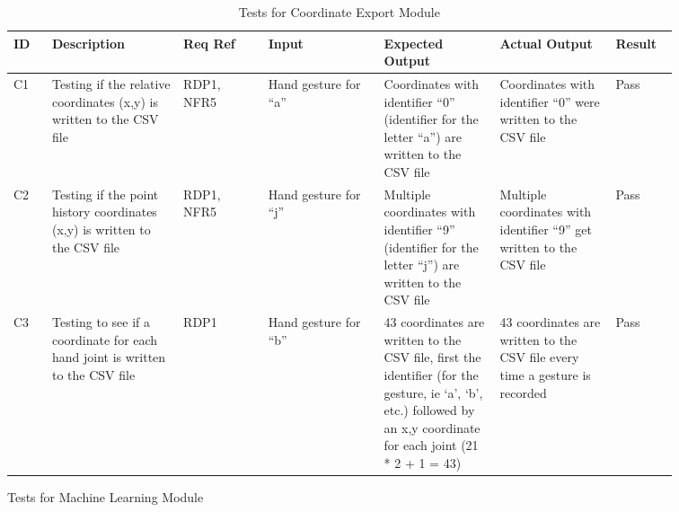 \documentclass[12pt, titlepage]{article}
\begin{document}
\renewcommand{\arraystretch}{1.2}
\noindent \begin{longtable}{p{0.05\linewidth}|p{0.17\linewidth}|p{0.11\linewidth}|p{0.15\linewidth}|p{0.15\linewidth}|p{0.15\linewidth}|p{0.08\linewidth}}
\hline
\textbf{ID} & \textbf{Description} & \textbf{Req Ref} & \textbf{Input} & \textbf{Expected Output} & \textbf{Actual Output} & \textbf{Result}\\
\hline
C1 & Testing if the relative coordinates (x,y) is written to the CSV file & RDP1, NFR5 & Hand gesture for “a” & Coordinates with identifier “0” (identifier for the letter “a”) are written to the CSV file & Coordinates with identifier “0” were written to the CSV file & Pass\\ \hline
C2 & Testing if the point history coordinates (x,y) is written to the CSV file & RDP1, NFR5 & Hand gesture for “j” & Multiple coordinates with identifier “9” (identifier for the letter “j”) are written to the CSV file & Multiple coordinates with identifier “9” get written to the CSV file & Pass\\ \hline
C3 & Testing to see if a coordinate for each hand joint is written to the CSV file & RDP1 & Hand gesture for “b” & 43 coordinates are written to the CSV file, first the identifier (for the gesture, ie ‘a’, ‘b’, etc.) followed by an x,y coordinate for each joint (21 * 2 + 1 = 43) & 43 coordinates are written to the CSV file every time a gesture is recorded & Pass
\hline
\caption{Tests for Coordinate Export Module}
\end{longtable}

\newpage
\centerline{Tests for Machine Learning Module}
\end{document}
